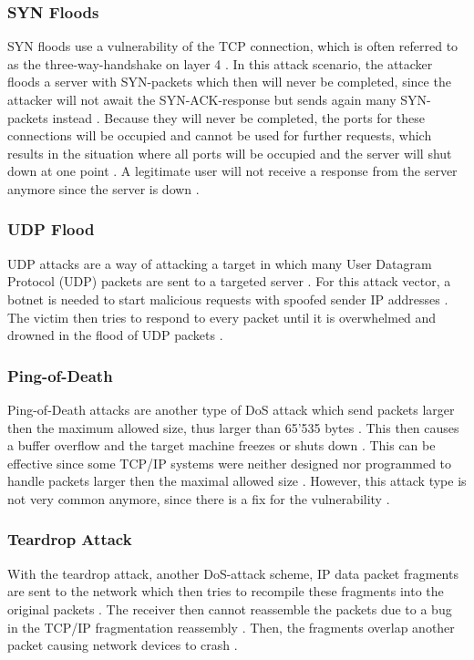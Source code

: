 \subsubsection*{SYN Floods}
SYN floods use a vulnerability of the TCP connection, which is often referred to as the three-way-handshake on layer 4 \cite{DoS-Norton, DoS-PCWelt}. In this attack scenario, the attacker floods a server with SYN-packets which then will never be completed, since the attacker will not await the SYN-ACK-response but sends again many SYN-packets instead \cite{DoS-Norton, DoS-PCWelt}. Because they will never be completed, the ports for these connections will be occupied and cannot be used for further requests, which results in the situation where all ports will be occupied and the server will shut down at one point \cite{DoS-Norton}. A legitimate user will not receive a response from the server anymore since the server is down \cite{DoS-PCWelt}. 

\subsubsection*{UDP Flood}
UDP attacks are a way of attacking a target in which many User Datagram Protocol (UDP) packets are sent to a targeted server \cite{Cloudflare-UDP}. For this attack vector, a botnet is needed to start malicious requests with spoofed sender IP addresses \cite{Cloudflare-UDP}. The victim then tries to respond to every packet until it is overwhelmed and drowned in the flood of UDP packets \cite{Cloudflare-UDP}. 

\subsubsection*{Ping-of-Death}
Ping-of-Death attacks are another type of DoS attack which send packets larger then the maximum allowed size, thus larger than 65'535 bytes \cite{PingOfDeath-Cloudflare}. This then causes a buffer overflow and the target machine freezes or shuts down \cite{PingOfDeath-Cloudflare}. This can be effective since some TCP/IP systems were neither designed nor programmed to handle packets larger then the maximal allowed size \cite{PingOfDeath-Cloudflare}. However, this attack type is not very common anymore, since there is a fix for the vulnerability  \cite{PingOfDeath-Cloudflare}. 

\subsubsection*{Teardrop Attack}
With the teardrop attack, another DoS-attack scheme, IP data packet fragments are sent to the network which then tries to recompile these fragments into the original packets \cite{DoS-Comparitech, DoS-Teardrop}. The receiver then cannot reassemble the packets due to a bug in the TCP/IP fragmentation reassembly \cite{DoS-Teardrop}. Then, the fragments overlap another packet causing network devices to crash \cite{DoS-Teardrop}. 

